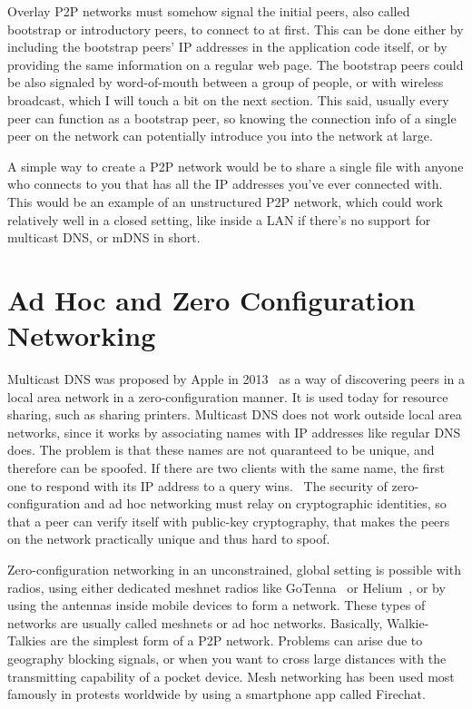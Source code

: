 Overlay P2P networks must somehow signal the initial peers, also called bootstrap or introductory peers, to connect to at first. This can be done either by including the bootstrap peers' IP addresses in the application code itself, or by providing the same information on a regular web page. The bootstrap peers could be also signaled by word-of-mouth between a group of people, or with wireless broadcast, which I will touch a bit on the next section. This said, usually every peer can function as a bootstrap peer, so knowing the connection info of a single peer on the network can potentially introduce you into the network at large.

A simple way to create a P2P network would be to share a single file with anyone who connects to you that has all the IP addresses you've ever connected with. This would be an example of an unstructured P2P network, which could work relatively well in a closed setting, like inside a LAN if there's no support for multicast DNS, or mDNS in short.

\section{Ad Hoc and Zero Configuration Networking}
Multicast DNS was proposed by Apple in 2013~\cite{Cheshire2013-ja} as a way of discovering peers in a local area network in a zero-configuration manner. It is used today for resource sharing, such as sharing printers. Multicast DNS does not work outside local area networks, since it works by associating names with IP addresses like regular DNS does. The problem is that these names are not quaranteed to be unique, and therefore can be spoofed. If there are two clients with the same name, the first one to respond with its IP address to a query wins.~\cite{Pdp2008-tg} The security of zero-configuration and ad hoc networking must relay on cryptographic identities, so that a peer can verify itself with public-key cryptography, that makes the peers on the network practically unique and thus hard to spoof.

Zero-configuration networking in an unconstrained, global setting is possible with radios, using either dedicated meshnet radios like GoTenna~\cite{GoTenna_undated-km} or Helium~\cite{Helium_undated-jv}, or by using the antennas inside mobile devices to form a network. These types of networks are usually called meshnets or ad hoc networks. Basically, Walkie-Talkies are the simplest form of a P2P network. Problems can arise due to geography blocking signals, or when you want to cross large distances with the transmitting capability of a pocket device. Mesh networking has been used most famously in protests worldwide by using a smartphone app called Firechat.~\cite{Milian2014-mt}

